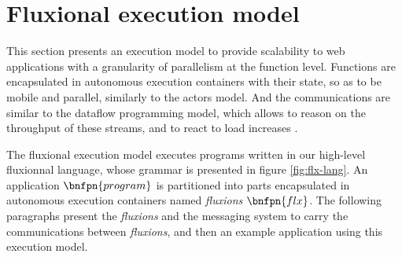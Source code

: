 \section{Fluxional execution model} \label{section:model}




This section presents an execution model to provide scalability to web applications with a granularity of parallelism at the function level.
Functions are encapsulated in autonomous execution containers with their state, so as to be mobile and parallel, similarly to the actors model.
And the communications are similar to the dataflow programming model, which allows to reason on the throughput of these streams, and to react to load increases \cite{Bartenstein2014}.


The fluxional execution model executes programs written in our high-level fluxionnal language, whose grammar is presented in figure \ref{fig:flx-lang}.
An application $\bnfpn{program}$ is partitioned into parts encapsulated in autonomous execution containers named \textit{fluxions} $\bnfpn{flx}$.
The following paragraphs present the \textit{fluxions} and the messaging system to carry the communications between \textit{fluxions}, and then an example application using this execution model.

